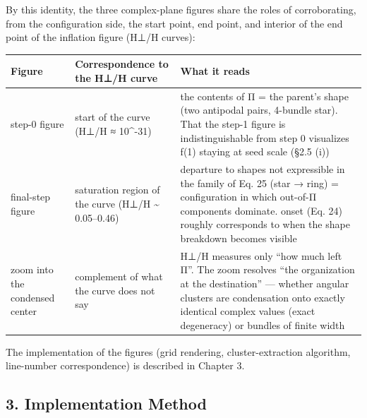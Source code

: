 \documentclass[
  a4paper,
]{ltjsarticle}
\newcounter{none} %
\begin{document}
By this identity, the three complex-plane figures share the roles of
corroborating, from the configuration side, the start point, end point,
and interior of the end point of the inflation figure (H⊥/H curves):

{\def\LTcaptype{none} %
\begin{longtable}[]{@{}
  >{\raggedright\arraybackslash}p{}
  >{\raggedright\arraybackslash}p{}
  >{\raggedright\arraybackslash}p{}@{}}
\toprule\noalign{}
\begin{minipage}[b]{\linewidth}\raggedright
Figure
\end{minipage} & \begin{minipage}[b]{\linewidth}\raggedright
Correspondence to the H⊥/H curve
\end{minipage} & \begin{minipage}[b]{\linewidth}\raggedright
What it reads
\end{minipage} \\
\midrule\noalign{}
\endhead
\bottomrule\noalign{}
\endlastfoot
step-0 figure & start of the curve (H⊥/H ≈ 10\^{}-31) & the contents of
Π = the parent's shape (two antipodal pairs, 4-bundle star). That the
step-1 figure is indistinguishable from step 0 visualizes f(1) staying
at seed scale (§2.5 (i)) \\
final-step figure & saturation region of the curve (H⊥/H
\textasciitilde{} 0.05--0.46) & departure to shapes not expressible in
the family of Eq. 25 (star → ring) = configuration in which out-of-Π
components dominate. onset (Eq. 24) roughly corresponds to when the
shape breakdown becomes visible \\
zoom into the condensed center & complement of what the curve does not
say & H⊥/H measures only ``how much left Π''. The zoom resolves ``the
organization at the destination'' --- whether angular clusters are
condensation onto exactly identical complex values (exact degeneracy) or
bundles of finite width \\
\end{longtable}
}

The implementation of the figures (grid rendering, cluster-extraction
algorithm, line-number correspondence) is described in Chapter 3.

\subsection{3. Implementation Method}\label{implementation-method}
\end{document}
